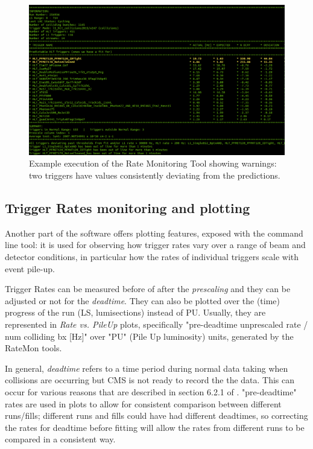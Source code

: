 \begin{figure}
    \centerline{
        \includegraphics[width=0.8\paperwidth]{figures/ratemon_warnings}}
    \caption{Example execution of the Rate Monitoring Tool showing warnings: two triggers have values consistently deviating from the predictions. \cite{ratemon-twiki}}
    \label{fig:ratemon_warnings}
\end{figure}

\subsection{Trigger Rates monitoring and plotting}

Another part of the software offers plotting features, exposed with the  command line tool: it is used for observing how trigger rates vary over a range of beam and detector conditions, in particular how the rates of individual triggers scale with event pile-up.

Trigger Rates can be measured before of after the \textit{prescaling} and they can be adjusted or not for the \textit{deadtime}. They can also be plotted over the (time) progress of the run (LS, lumisections) instead of PU. Usually, they are represented in \textit{Rate vs. PileUp} plots, specifically "pre-deadtime unprescaled rate / num colliding bx [Hz]" over "PU" (Pile Up luminosity) units, generated by the RateMon tools.

In general, \textit{deadtime} refers to a time period during normal data taking when collisions are occurring but CMS is not ready to record the the data. This can occur for various reasons that are described in section 6.2.1 of \cite{Khachatryan_2017}. "pre-deadtime" rates are used in plots to allow for consistent comparison between different runs/fills; different runs and fills could have had different deadtimes, so correcting the rates for deadtime before fitting will allow the rates from different runs to be compared in a consistent way.

